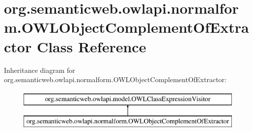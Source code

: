 \hypertarget{classorg_1_1semanticweb_1_1owlapi_1_1normalform_1_1_o_w_l_object_complement_of_extractor}{\section{org.\-semanticweb.\-owlapi.\-normalform.\-O\-W\-L\-Object\-Complement\-Of\-Extractor Class Reference}
\label{classorg_1_1semanticweb_1_1owlapi_1_1normalform_1_1_o_w_l_object_complement_of_extractor}
}
Inheritance diagram for org.\-semanticweb.\-owlapi.\-normalform.\-O\-W\-L\-Object\-Complement\-Of\-Extractor\-:\begin{figure}[H]
\begin{center}
\leavevmode
\includegraphics[height=2.000000cm]{classorg_1_1semanticweb_1_1owlapi_1_1normalform_1_1_o_w_l_object_complement_of_extractor}
\end{center}
\end{figure}
